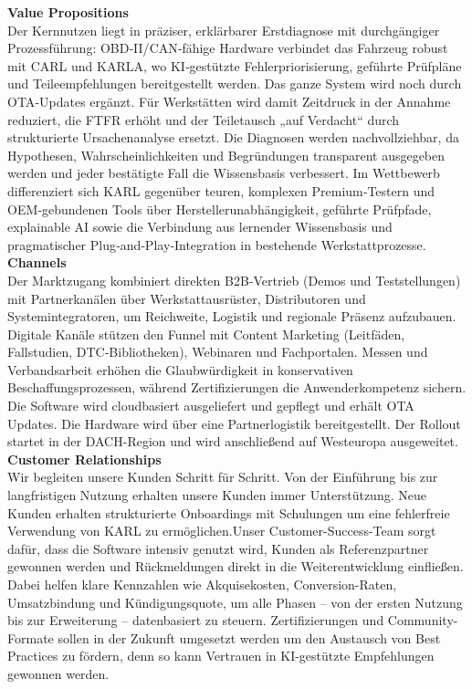 \textbf{Value Propositions}\\
Der Kernnutzen liegt in präziser, erklärbarer Erstdiagnose mit durchgängiger Prozessführung: \ac{OBD}‑II/\ac{CAN}‑fähige Hardware verbindet das Fahrzeug robust mit \ac{CARL} und \ac{KARLA}, wo \ac{KI}‑gestützte Fehlerpriorisierung, geführte Prüfpläne und Teileempfehlungen bereitgestellt werden. Das ganze System wird noch durch \ac{OTA}‑Updates ergänzt. Für Werkstätten wird damit Zeitdruck in der Annahme reduziert, die \ac{FTFR} erhöht und der Teiletausch „auf Verdacht“ durch strukturierte Ursachenanalyse ersetzt. Die Diagnosen werden nachvollziehbar, da Hypothesen, Wahrscheinlichkeiten und Begründungen transparent ausgegeben werden und jeder bestätigte Fall die Wissensbasis verbessert. Im Wettbewerb differenziert sich \ac{KARL} gegenüber teuren, komplexen Premium‑Testern und \ac{OEM}‑gebundenen Tools über Herstellerunabhängigkeit, geführte Prüfpfade, explainable AI sowie die Verbindung aus lernender Wissensbasis und pragmatischer Plug‑and‑Play‑Integration in bestehende Werkstattprozesse.\\

\textbf{Channels}\\
Der Marktzugang kombiniert direkten \ac{B2B}‑Vertrieb (Demos und Teststellungen) mit Partnerkanälen über Werkstattausrüster, Distributoren und Systemintegratoren, um Reichweite, Logistik und regionale Präsenz aufzubauen. Digitale Kanäle stützen den Funnel mit Content Marketing (Leitfäden, Fallstudien, \ac{DTC}‑Bibliotheken), Webinaren und Fachportalen. Messen und Verbandsarbeit erhöhen die Glaubwürdigkeit in konservativen Beschaffungsprozessen, während Zertifizierungen die Anwenderkompetenz sichern. Die Software wird cloudbasiert ausgeliefert und gepflegt und erhält \ac{OTA} Updates. Die Hardware wird über eine Partnerlogistik bereitgestellt. Der Rollout startet in der DACH-Region und wird anschließend auf Westeuropa ausgeweitet. \\

\textbf{Customer Relationships} \\
Wir begleiten unsere Kunden Schritt für Schritt. Von der Einführung bis zur langfristigen Nutzung erhalten unsere Kunden immer Unterstützung. Neue Kunden erhalten strukturierte Onboardings mit Schulungen um eine fehlerfreie Verwendung von KARL zu ermöglichen.Unser Customer-Success-Team sorgt dafür, dass die Software intensiv genutzt wird, Kunden als Referenzpartner gewonnen werden und Rückmeldungen direkt in die Weiterentwicklung einfließen. Dabei helfen klare Kennzahlen wie Akquisekosten, Conversion-Raten, Umsatzbindung und Kündigungsquote, um alle Phasen – von der ersten Nutzung bis zur Erweiterung – datenbasiert zu steuern. Zertifizierungen und Community-Formate sollen in der Zukunft umgesetzt werden um den Austausch von Best Practices zu fördern, denn so kann Vertrauen in KI-gestützte Empfehlungen gewonnen werden. \\

